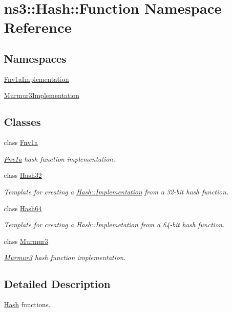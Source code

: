 \hypertarget{namespacens3_1_1Hash_1_1Function}{}\section{ns3\+:\+:Hash\+:\+:Function Namespace Reference}
\label{namespacens3_1_1Hash_1_1Function}
\subsection*{Namespaces}
\begin{DoxyCompactItemize}
\item 
 \hyperlink{namespacens3_1_1Hash_1_1Function_1_1Fnv1aImplementation}{Fnv1a\+Implementation}
\item 
 \hyperlink{namespacens3_1_1Hash_1_1Function_1_1Murmur3Implementation}{Murmur3\+Implementation}
\end{DoxyCompactItemize}
\subsection*{Classes}
\begin{DoxyCompactItemize}
\item 
class \hyperlink{classns3_1_1Hash_1_1Function_1_1Fnv1a}{Fnv1a}
\begin{DoxyCompactList}\small\item\em \hyperlink{classns3_1_1Hash_1_1Function_1_1Fnv1a}{Fnv1a} hash function implementation. \end{DoxyCompactList}\item 
class \hyperlink{classns3_1_1Hash_1_1Function_1_1Hash32}{Hash32}
\begin{DoxyCompactList}\small\item\em Template for creating a \hyperlink{classns3_1_1Hash_1_1Implementation}{Hash\+::\+Implementation} from a 32-\/bit hash function. \end{DoxyCompactList}\item 
class \hyperlink{classns3_1_1Hash_1_1Function_1_1Hash64}{Hash64}
\begin{DoxyCompactList}\small\item\em Template for creating a Hash\+::\+Implemetation from a 64-\/bit hash function. \end{DoxyCompactList}\item 
class \hyperlink{classns3_1_1Hash_1_1Function_1_1Murmur3}{Murmur3}
\begin{DoxyCompactList}\small\item\em \hyperlink{classns3_1_1Hash_1_1Function_1_1Murmur3}{Murmur3} hash function implementation. \end{DoxyCompactList}\end{DoxyCompactItemize}


\subsection{Detailed Description}
\hyperlink{namespacens3_1_1Hash}{Hash} functions. 